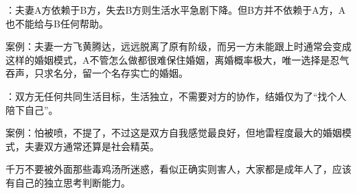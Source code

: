 \documentclass[UTF8,11pt,oneside]{ctexart}
\begin{document}
：夫妻A方依赖于B方，失去B方则生活水平急剧下降。但B方并不依赖于A方，A也不能给与B任何帮助。

案例：夫妻一方飞黄腾达，远远脱离了原有阶级，而另一方未能跟上时通常会变成这样的婚姻模式，A不管怎么做都很难保住婚姻，离婚概率极大，唯一选择是忍气吞声，只求名分，留一个名存实亡的婚姻。

：双方无任何共同生活目标，生活独立，不需要对方的协作，结婚仅为了“找个人陪下自己”。

案例：怕被喷，不提了，不过这是双方自我感觉最良好，但地雷程度最大的婚姻模式，夫妻双方通常还算是社会精英。


千万不要被外面那些毒鸡汤所迷惑，看似正确实则害人，大家都是成年人了，应该有自己的独立思考判断能力。

\end{document}
